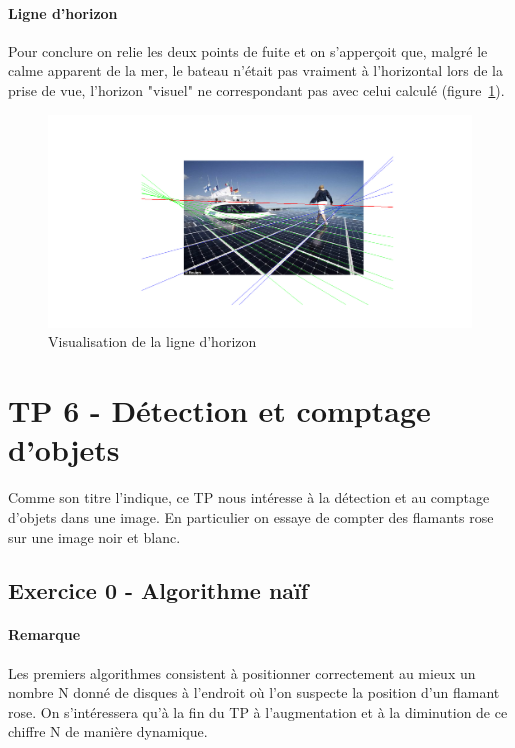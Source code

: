\documentclass{article}
\begin{document}
\paragraph{Ligne d'horizon}
Pour conclure on relie les deux points de fuite et on s'apperçoit que, malgré le calme apparent de la mer, le bateau n'était pas vraiment à l'horizontal lors de la prise de vue, l'horizon "visuel" ne correspondant pas avec celui calculé (figure~\ref{5-horizon}).
\begin{figure}[!ht]
    \centering
    \includegraphics[width=\linewidth]{images/5-houle.png}
    \caption{Visualisation de la ligne d'horizon}
    \label{5-horizon}
\end{figure}

\clearpage
\section{TP 6 - Détection et comptage d'objets}
Comme son titre l'indique, ce TP nous intéresse à la détection et au comptage d'objets dans une image. En particulier on essaye de compter des flamants rose sur une image noir et blanc.

\subsection{Exercice 0 - Algorithme naïf}
\paragraph{Remarque}
Les premiers algorithmes consistent à positionner correctement au mieux un nombre N donné de disques à l'endroit où l'on suspecte la position d'un flamant rose. On s'intéressera qu'à la fin du TP à l'augmentation et à la diminution de ce chiffre N de manière dynamique.
\end{document}
